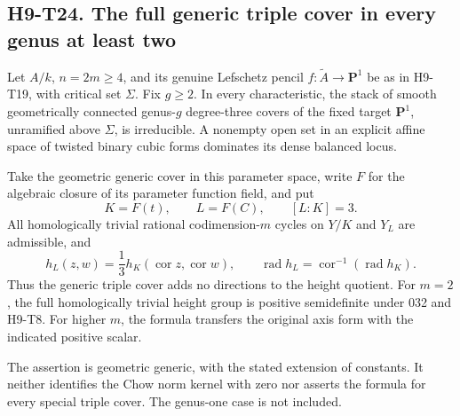 
\subsection*{H9-T24. The full generic triple cover in every genus at least two}

\begin{theorem}[H9-T24]
Let $A/k$, $n=2m\ge4$, and its genuine Lefschetz pencil
$f:\widetilde A\to\mathbf P^1$ be as in H9-T19, with
critical set $\Sigma$. Fix $g\ge2$. In every characteristic,
the stack of smooth geometrically connected genus-$g$
degree-three covers of the fixed target $\mathbf P^1$,
unramified above $\Sigma$, is irreducible. A nonempty open
set in an explicit affine space of twisted binary cubic
forms dominates its dense balanced locus.

Take the geometric generic cover in this parameter space,
write $F$ for the algebraic closure of its parameter
function field, and put
\[
       K=F(t),\qquad L=F(C),\qquad [L:K]=3.
\]
All homologically trivial rational codimension-$m$ cycles
on $Y/K$ and $Y_L$ are admissible, and
\[
 h_L(z,w)=\frac13 h_K(\operatorname{cor}z,
                              \operatorname{cor}w),\qquad
 \operatorname{rad}h_L
      =\operatorname{cor}^{-1}(\operatorname{rad}h_K).
                                                               \tag{H9.135}
\]
Thus the generic triple cover adds no directions to the
height quotient. For $m=2$, the full homologically trivial
height group is positive semidefinite under 032 and H9-T8.
For higher $m$, the formula transfers the original axis
form with the indicated positive scalar.

The assertion is geometric generic, with the stated
extension of constants. It neither identifies the Chow
norm kernel with zero nor asserts the formula for every
special triple cover. The genus-one case is not included.
\end{theorem}

